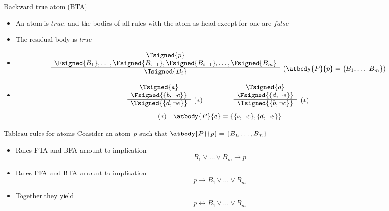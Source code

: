 \begin{frame}{Backward true atom (BTA)}
\begin{itemize}
\item {}
  An atom is $\mathit{true}$, and the bodies of all rules with the atom as head except for one are $\mathit{false}$
\item {} The residual body is $\mathit{true}$
\item {}
\[
\begin{array}{cl}
\Tsigned{p} \\
\Fsigned{B_1},\dots,\Fsigned{B_{i-1}},\Fsigned{B_{i+1}},\dots,\Fsigned{B_m} &
\raisebox{-8pt}[0pt][0pt]{($\atbody{P}{p} = \{B_1,\dots,B_m\}$)}
\\\cline{1-1}
\Tsigned{B_i}
\end{array}
\]
\item<2-> 
\[
\begin{array}{cl}
\Tsigned{a} \\
\Fsigned{\{b,\neg c\}} &
\raisebox{-8pt}[0pt][0pt]{$(*)$}
\\\cline{1-1}
\Tsigned{\{d,\neg e\}}
\end{array}
\qquad\qquad
\begin{array}{cl}
\Tsigned{a} \\
\Fsigned{\{d,\neg e\}} &
\raisebox{-8pt}[0pt][0pt]{$(*)$}
\\\cline{1-1}
\Tsigned{\{b,\neg c\}}
\end{array}
\hfill
\]
\[
\hfill
(*)\quad \atbody{P}{a} = \{\{b,\neg c\},\{d,\neg e\}\}
\hfill\hfill
\]
\end{itemize}
\end{frame}
\begin{frame}{Tableau rules for atoms}
Consider an atom~$p$ such that $\atbody{P}{p}=\{B_1,\dots,B_m\}$
\bigskip
\begin{itemize}
\item<1-> Rules FTA and BFA amount to implication
  \[
  B_1 \vee \dots \vee B_m \rightarrow p
  \]
\item<2-> Rules FFA and BTA amount to implication
  \[
  p \rightarrow B_1 \vee \dots \vee B_m
  \]
\item<3-> Together they yield
  \[
  p \leftrightarrow B_1 \vee \dots \vee B_m
  \]
\end{itemize}
\end{frame}
